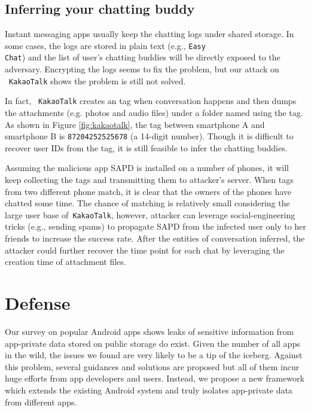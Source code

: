\documentclass{sig-alternate}
\begin{document}
\begin{figure}[ht]
\end{figure}


\subsection{Inferring your chatting buddy}
\label{sec:connection_attack}


Instant messaging apps usually keep the chatting logs under shared storage. In some cases, the logs are stored in plain text (e.g., \texttt{Easy\\Chat}) and the list of user's chatting buddies will be directly exposed to the adversary. Encrypting the logs seems to fix the problem, but our attack on ~\texttt{KakaoTalk} shows the problem is still not solved.

In fact, ~\texttt{KakaoTalk} creates an tag when conversation happens and then dumps the attachments (e.g. photos and audio files) under a folder named using the tag. As shown in Figure \ref{fig:kakaotalk}, the tag between smartphone A and smartphone B is \texttt{87204252525678} (a 14-digit number). Though it is difficult to recover user IDs from the tag, it is still feasible to infer the chatting buddies.

Assuming the malicious app SAPD is installed on a number of phones, it will keep collecting the tags and transmitting them to attacker's server. When tags from two different phone match, it is clear that the owners of the phones have chatted some time. The chance of matching is relatively small considering the large user base of~\texttt{KakaoTalk}, however, attacker can leverage social-engineering tricks (e.g., sending spams) to propagate SAPD from the infected user only to her friends to increase the success rate. After the entities of conversation inferred, the attacker could further recover the time point for each chat by leveraging the creation time of attachment files.


\section{Defense}
\label{sec:defense}

Our survey on popular Android apps shows leaks of sensitive information from app-private data stored on public storage do exist. Given the number of all apps in the wild, the issues we found are very likely to be a tip of the iceberg. Against this problem, several guidances and solutions are proposed but all of them incur huge efforts from app developers and users. Instead, we propose a new framework which extends the existing Android system and truly isolates app-private data from different apps.
\end{document}
